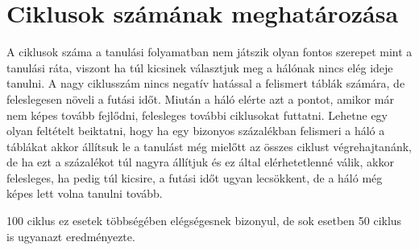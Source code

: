 \section{Ciklusok számának meghatározása}

A ciklusok száma a tanulási folyamatban nem játszik olyan fontos szerepet mint a tanulási ráta, viszont ha túl kicsinek választjuk meg a hálónak nincs elég ideje tanulni. A nagy ciklusszám nincs negatív hatással a felismert táblák számára, de feleslegesen növeli a futási időt. Miután a háló elérte azt a pontot, amikor már nem képes tovább fejlődni, felesleges további ciklusokat futtatni. Lehetne egy olyan feltételt beiktatni, hogy ha egy bizonyos százalékban felismeri a háló a táblákat akkor állítsuk le a tanulást még mielőtt az összes ciklust végrehajtanánk, de ha ezt a százalékot túl nagyra állítjuk és ez által elérhetetlenné válik, akkor felesleges, ha pedig túl kicsire, a futási időt ugyan lecsökkent, de a háló még képes lett volna tanulni tovább.

100 ciklus ez esetek többségében elégségesnek bizonyul, de sok esetben 50 ciklus is ugyanazt eredményezte. 

